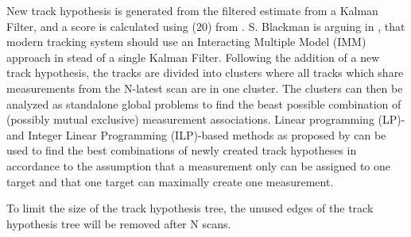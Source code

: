 New track hypothesis is generated from the filtered estimate from a Kalman Filter, and a score is calculated using (20) from \cite{Bar-Shalom2007}. S. Blackman is arguing in \cite{Blackman2004}, that modern tracking system should use an Interacting Multiple Model (IMM) approach in stead of a single Kalman Filter. Following the addition of a new track hypothesis, the tracks are divided into clusters where all tracks which share measurements from the N-latest scan are in one cluster. The clusters can then be analyzed as standalone global problems to find the beast possible combination of (possibly mutual exclusive) measurement associations. Linear programming (LP)- and Integer Linear Programming (ILP)-based methods as proposed by \cite{Storms2003} can be used to find the best combinations of newly created track hypotheses in accordance to the assumption that a measurement only can be assigned to one target and that one target can maximally create one measurement.

To limit the size of the track hypothesis tree, the unused edges of the track hypothesis tree will be removed after N scans.

